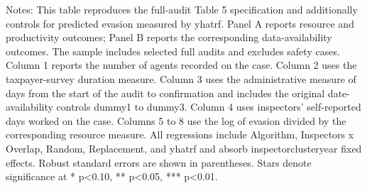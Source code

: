 \begin{table}[H]\centering
\begin{threeparttable}
\caption{Table 5: Resources Allocated to Audits and Audit Productivity, Full Audits, with Predicted Evasion Control}
\label{tab:table5_fullaudits_yhatrf_control}

\footnotesize


\begin{tablenotes}[flushleft]
\footnotesize
\item Notes: This table reproduces the full-audit Table 5 specification and additionally controls for predicted evasion measured by yhatrf. Panel A reports resource and productivity outcomes; Panel B reports the corresponding data-availability outcomes. The sample includes selected full audits and excludes safety cases. Column 1 reports the number of agents recorded on the case. Column 2 uses the taxpayer-survey duration measure. Column 3 uses the administrative measure of days from the start of the audit to confirmation and includes the original date-availability controls dummy1 to dummy3. Column 4 uses inspectors' self-reported days worked on the case. Columns 5 to 8 use the log of evasion divided by the corresponding resource measure. All regressions include Algorithm, Inspectors x Overlap, Random, Replacement, and yhatrf and absorb inspectorclusteryear fixed effects. Robust standard errors are shown in parentheses. Stars denote significance at * p<0.10, ** p<0.05, *** p<0.01.
\end{tablenotes}
\end{threeparttable}
\end{table}
